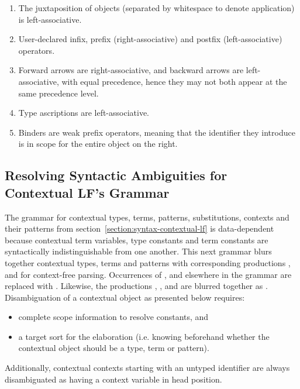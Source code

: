 \begin{enumerate}
\item The juxtaposition of \LF objects (separated by whitespace to denote application) is left-associative.
\item User-declared infix, prefix (right-associative) and postfix (left-associative) operators.
\item Forward arrows are right-associative, and backward arrows are left-associative, with equal precedence, hence they may not both appear at the same precedence level.
\item Type ascriptions are left-associative.
\item Binders are weak prefix operators, meaning that the identifier they introduce is in scope for the entire \LF object on the right.
\end{enumerate}

\subsection{Resolving Syntactic Ambiguities for Contextual \acs{LF}'s Grammar}

The grammar for contextual \LF types, terms, patterns, substitutions, contexts and their patterns from section~\ref{section:syntax-contextual-lf} is data-dependent because contextual \LF term variables, type constants and term constants are syntactically indistinguishable from one another.
This next grammar blurs together contextual \LF types, terms and patterns with corresponding productions ,  and  for context-free parsing.
Occurrences of ,  and  elsewhere in the grammar are replaced with .
Likewise, the productions , ,  and  are blurred together as .
Disambiguation of a contextual \LF object as presented below requires:
\begin{itemize}
\item complete scope information to resolve constants, and
\item a target sort for the elaboration (i.e. knowing beforehand whether the contextual \LF object should be a type, term or pattern).
\end{itemize}
Additionally, contextual \LF contexts starting with an untyped identifier are always disambiguated as having a context variable in head position.


